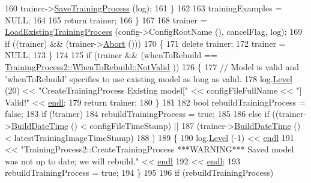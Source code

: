 \begin{DoxyCode}
160         trainer->\hyperlink{class_k_k_m_l_l_1_1_training_process2_a251864b9100b64113649b171b2634900}{SaveTrainingProcess} (log);
161     \}
162 
163     trainingExamples = NULL;
164 
165     \textcolor{keywordflow}{return} trainer;
166   \}
167 
168   trainer = \hyperlink{class_k_k_m_l_l_1_1_training_process2_acb1e01bb8bae43fda6fa37136766aacc}{LoadExistingTrainingProcess} (config->ConfigRootName (), cancelFlag, 
      log);
169   \textcolor{keywordflow}{if}  ((trainer)  &&  (trainer->\hyperlink{class_k_k_m_l_l_1_1_training_process2_a11725f4aac3b45c7a070bc78aa406724}{Abort} ()))
170   \{
171     \textcolor{keyword}{delete}  trainer;
172     trainer = NULL;
173   \}
174 
175   \textcolor{keywordflow}{if}  (trainer  &&  (whenToRebuild == \hyperlink{class_k_k_m_l_l_1_1_training_process2_acc48e76f6978c8c8c0c849eec2d0ee53a04665ec171e86ef749cc563d7bdeec91}{TrainingProcess2::WhenToRebuild::NotValid}
      ))
176   \{
177     \textcolor{comment}{// Model is valid and 'whenToRebuild' specifies to use existing model as long as valid.}
178     log.\hyperlink{class_k_k_b_1_1_run_log_a32cf761d7f2e747465fd80533fdbb659}{Level} (20) << \textcolor{stringliteral}{"CreateTrainingProcess   Existing model["} << configFileFullName << \textcolor{stringliteral}{"] Valid!"} <<
       \hyperlink{namespace_k_k_b_ad1f50f65af6adc8fa9e6f62d007818a8}{endl};
179     \textcolor{keywordflow}{return}  trainer;
180   \}
181 
182   \textcolor{keywordtype}{bool}  rebuildTrainingProcess = \textcolor{keyword}{false};
183   \textcolor{keywordflow}{if}  (!trainer)
184     rebuildTrainingProcess = \textcolor{keyword}{true};
185 
186   \textcolor{keywordflow}{else} \textcolor{keywordflow}{if}  ((trainer->\hyperlink{class_k_k_m_l_l_1_1_training_process2_a9e7c7d8c3ad4b7b80859c9093ebf6aaf}{BuildDateTime} () < configFileTimeStamp)  ||
187             (trainer->\hyperlink{class_k_k_m_l_l_1_1_training_process2_a9e7c7d8c3ad4b7b80859c9093ebf6aaf}{BuildDateTime} () < latestTrainingImageTimeStamp)
188            )
189   \{
190     log.\hyperlink{class_k_k_b_1_1_run_log_a32cf761d7f2e747465fd80533fdbb659}{Level} (-1) << \hyperlink{namespace_k_k_b_ad1f50f65af6adc8fa9e6f62d007818a8}{endl}
191       << \textcolor{stringliteral}{"TrainingProcess2::CreateTrainingProcess   ***WARNING***  Saved model was not up to date;  we will
       rebuild."} << \hyperlink{namespace_k_k_b_ad1f50f65af6adc8fa9e6f62d007818a8}{endl}
192       << \hyperlink{namespace_k_k_b_ad1f50f65af6adc8fa9e6f62d007818a8}{endl};
193     rebuildTrainingProcess = \textcolor{keyword}{true};
194   \}
195 
196   \textcolor{keywordflow}{if}  (rebuildTrainingProcess)

\end{DoxyCode}
